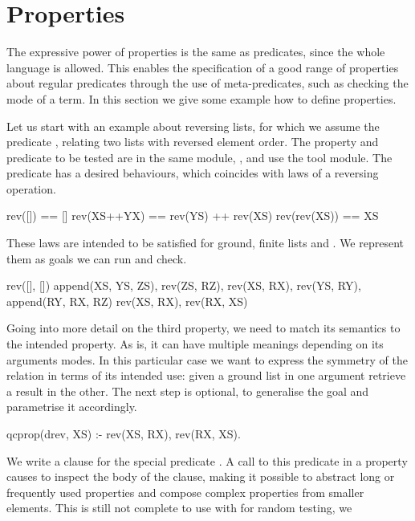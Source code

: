 
\section{Properties}
\label{sec:properties}


The expressive power of properties is the same as \Prolog{} predicates,
since the whole language is allowed.
%
This enables the specification of a good range of properties about
regular predicates through the use of meta-predicates, such as checking
the mode of a term.
%
In this section we give some example how to define properties.


Let us start with an example about reversing lists, for which we assume the
predicate , relating two lists with reversed element order.
%
The property and predicate to be tested are in the same module,
, and use the \plqc{} tool module.
%
The  predicate has a desired behaviours, which
coincides with laws of a reversing operation.
{
\begin{code}
      rev([])   == []
  rev(XS++YX)   == rev(YS) ++ rev(XS)
  rev(rev(XS))  == XS
\end{code}
}
These laws are intended to be satisfied for ground, finite lists
 and .
%
We represent them as \Prolog{} goals we can run and check.
%
\begin{yapcode}
 rev([], [])
 append(XS, YS, ZS), rev(ZS, RZ),
  rev(XS, RX), rev(YS, RY),
   append(RY, RX, RZ)
 rev(XS, RX), rev(RX, XS)
\end{yapcode}
%
Going into more detail on the third property, we need to match its
semantics to the intended property.
%
As is, it can have multiple meanings depending on its arguments modes.
%
In this particular case we want to express the symmetry of the
 relation in terms of its intended use: given a ground
list in one argument retrieve a result in the other.
%
The next step is optional, to generalise the goal and parametrise it
accordingly.
%
\begin{yapcode}
 qcprop({drev, XS}) :-
   rev(XS, RX), rev(RX, XS).
\end{yapcode}
%
We write a clause for the special predicate .
%
A call to this predicate in a property causes \plqc{} to inspect the
body of the clause, making it possible to abstract long or frequently
used properties and compose complex properties from smaller elements.
%
This is still not complete to use with \plqc{} for random testing, we
